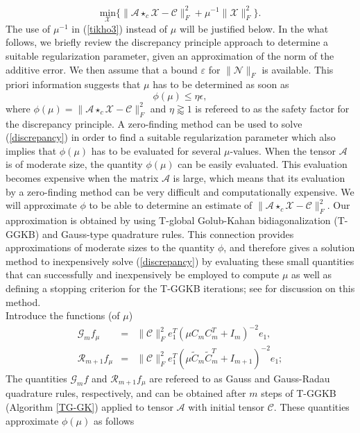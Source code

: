 \documentclass{siamltex}
\newcommand{\1}{\mathbb{1}}
\newcommand{\0}{\mathbb{0}}
\begin{document}
	\begin{equation}\label{tikho3}
	\underset{\mathscr{X}}{\text{min}}\{\|\mathscr{A} \star_c \mathscr{X} - \mathscr{C}  \|_F^2+\mu^{-1} \|\mathscr{X}\|_F^2\}.
	\end{equation}
	The  use of  $\mu^{-1} $
	in (\ref{tikho3}) instead of $\mu$  will be justified below. In the what follows, we briefly review the discrepancy principle approach to determine a suitable regularization parameter, given an approximation of the norm of the additive error. We then assume that a bound $\varepsilon$ for $\|\mathscr{N}\|_F$ is available. This priori information suggests that $\mu$ has to be determined  as soon as
	\begin{equation}\label{discrepancy}
	\phi(\mu)\leq\eta\epsilon,
	\end{equation}
	where $\phi(\mu)=\|\mathscr{A} \star_c \mathscr{X} - \mathscr{C}  \|_F^2$ and  $ \eta\gtrapprox 1$ is refereed to  as the safety factor for the discrepancy principle. A zero-finding method can be used to solve (\ref{discrepancy}) in order to find a suitable regularization parameter which also implies that $\phi(\mu)$ has to be evaluated for several $\mu$-values. When the tensor  $\mathscr{A}$ is of moderate size, the quantity $\phi(\mu)$ can be easily evaluated. This evaluation becomes expensive when the matrix $\mathscr{A}$ is large, which means that its evaluation by a  zero-finding method can be very difficult and computationally expensive.  We will approximate $\phi$ to be able to determine an estimate of  $\|\mathscr{A} \star_c \mathscr{X} - \mathscr{C}  \|_F^2$.  Our approximation is obtained by using  T-global Golub-Kahan bidiagonalization (T-GGKB) and  Gauss-type quadrature rules. This connection provides approximations of moderate sizes to the quantity  $\phi$, and therefore gives a solution method to inexpensively solve (\ref{discrepancy}) by evaluating these small quantities that can successfully and inexpensively be employed to compute $\mu$ as well as defining a stopping criterion for  the T-GGKB iterations;  see \cite{belguide, belguide2} for discussion on this method.\\
	Introduce the functions (of $\mu$)
	\begin{eqnarray}\label{Gkfmu}
	\mathcal{G}_m f_\mu&=&\|\mathscr{C}\|_F^2 e_1^T(\mu C_m C_m^T+I_m)^{-2}e_1,\\
	{\mathcal R}_{m+1}f_\mu&=&\|\mathcal{C}\|_F^2 e_1^T(\mu \widetilde{C}_m\widetilde{C}_m^T+I_{m+1})^{-2}e_1;
	\end{eqnarray}
	The quantities   $\mathcal{G}_m f$ and ${\mathcal R}_{m+1}f_\mu$ are refereed to as   Gauss and Gauss-Radau quadrature rules, respectively, and can be obtained after $m$ steps of T-GGKB (Algorithm \ref{TG-GK}) applied to tensor $\mathscr{A}$ with initial tensor $\mathscr{C}$. These quantities  approximate $\phi(\mu)$ as follows
\end{document}
